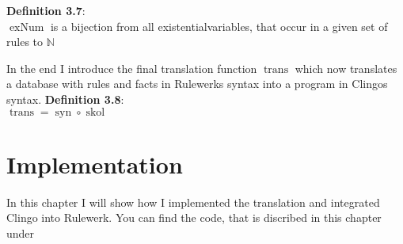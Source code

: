 \documentclass[hyperref, bachelorofscience]{cgvpub}
\renewenvironment{shaded}{%
  \def\FrameCommand{\fboxsep=\FrameSep \colorbox{shadecolor}}%
  \MakeFramed{\advance\hsize-\width \FrameRestore\FrameRestore}}%
 {\endMakeFramed}
\DeclareMathOperator{\trans}{trans}
\DeclareMathOperator{\syn}{syn}
\DeclareMathOperator{\skol}{skol}
\DeclareMathOperator{\exNum}{exNum}
\begin{document}
\begin{shaded}
\textbf{Definition 3.7}: \\
$\exNum$ is a bijection from all existentialvariables, that occur in a given set of rules to $\mathbb{N}$
\end{shaded}

In the end I introduce the final translation function $\trans$ which now translates a database with rules and facts in Rulewerks syntax into a program in Clingos syntax. 
\begin{shaded}
\textbf{Definition 3.8}: \\
$\trans = \syn \circ \skol$
\end{shaded}

\chapter{Implementation}
In this chapter I will show how I implemented the translation and integrated Clingo into Rulewerk. You can find the code, that is discribed in this chapter under \cite{B2020}
\end{document}
